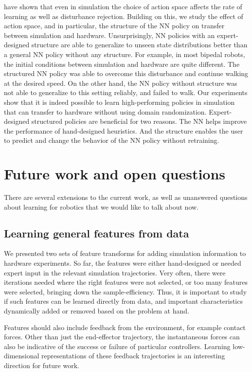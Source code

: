 \cite{peng2017learning} have shown that even in simulation the choice of action space affects the rate of learning as well as disturbance rejection. Building on this, we study the effect of action space, and in particular, the structure of the NN policy on transfer between simulation and hardware. Unsurprisingly, NN policies with an expert-designed structure are able to generalize to unseen state distributions better than a general NN policy without any structure. For example, in most bipedal robots, the initial conditions between simulation and hardware are quite different. The structured NN policy was able to overcome this disturbance and continue walking at the desired speed. On the other hand, the NN policy without structure was not able to generalize to this setting reliably, and failed to walk. Our experiments show that it is indeed possible to learn high-performing policies in simulation that can transfer to hardware without using domain randomization. Expert-designed structured policies are beneficial for two reasons. The NN helps improve the performance of hand-designed heuristics. And the structure enables the user to predict and change the behavior of the NN policy without retraining. 

\section{Future work and open questions}

There are several extensions to the current work, as well as unanswered questions about learning for robotics that we would like to talk about now.

\subsection{Learning general features from data}

We presented two sets of feature transforms for adding simulation information to hardware experiments. So far, the features were either hand-designed or needed expert input in the relevant simulation trajectories. Very often, there were iterations needed where the right features were not selected, or too many features were selected, bringing down the sample-efficiency. Thus, it is important to study if such features can be learned directly from data, and important characteristics dynamically added or removed based on the problem at hand. 

Features should also include feedback from the environment, for example contact forces. Other than just the end-effector trajectory, the instantaneous forces can also be indicative of the success or failure of particular controllers. Learning low-dimensional representations of these feedback trajectories is an interesting direction for future work. 

